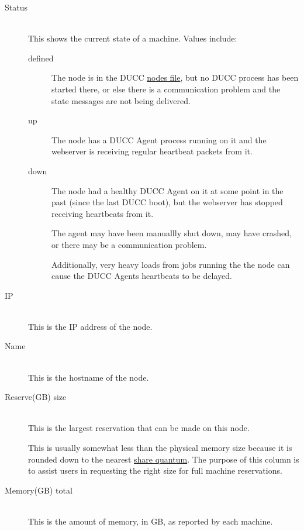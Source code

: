    \begin{description}
      \item[Status] \hfill \\
        This shows the current state of a machine.  Values include:
        \begin{description}
          \item[defined] The node is in the DUCC
            \hyperref[sec:admin-ducc.nodes]{nodes file}, but no DUCC process has been
            started there, or else there is a communication problem and
            the state messages are not being delivered.
            \item[up] The node has a DUCC Agent process running on it and the
              webserver is receiving regular heartbeat packets from it.
            \item[down] The node had a healthy DUCC Agent on it at some point
              in the past (since the last DUCC boot), but the webserver has stopped
              receiving heartbeats from it. 

              The agent may have been manuallly shut down, may have crashed, or there
              may be a communication problem.

              Additionally, very heavy loads from jobs running the the node can cause
              the DUCC Agents heartbeats to be delayed.
        \end{description}


      \item[IP] \hfill \\
        This is the IP address of the node.

      \item[Name] \hfill \\
        This is the hostname of the node.

      \item[Reserve(GB) size] \hfill \\
        This is the largest reservation that can be made on this node.

        This is usually somewhat less than the physical memory size because it is 
        rounded down to the nearest \hyperref[chap:rm]{share quantum}.  The purpose of this
        column is to assist users in requesting the right size for full machine 
        reservations.

      \item[Memory(GB) total] \hfill \\
        This is the amount of memory, in GB, as reported by each machine.
        

\end{description}
